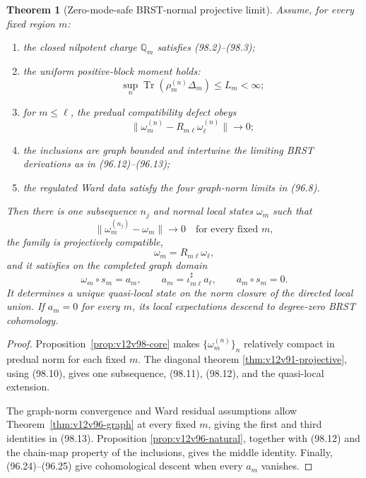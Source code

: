 \documentclass[11pt]{article}
\newtheorem{theorem}{Theorem}[section]
\theoremstyle{remark}
\begin{document}
\begin{theorem}[Zero-mode-safe BRST-normal projective limit]
\label{thm:v12v98-integrated}
Assume, for every fixed region \(m\):

\begin{enumerate}
\item the closed nilpotent charge \({\mathbb Q}_m\) satisfies
(98.2)--(98.3);
\item the uniform positive-block moment holds:
\[
 \sup_n\operatorname{Tr}(\rho_m^{(n)}\Delta_m)\leq L_m<\infty;
                                                                    \tag{98.9}
\]
\item for \(m\leq\ell\), the predual compatibility defect obeys
\[
 \|\omega_m^{(n)}
 -R_{m\ell}\omega_\ell^{(n)}\|\longrightarrow0;                 \tag{98.10}
\]
\item the inclusions are graph bounded and intertwine the limiting
BRST derivations as in (96.12)--(96.13);
\item the regulated Ward data satisfy the four graph-norm limits in
(96.8).
\end{enumerate}

Then there is one subsequence \(n_j\) and normal local states
\(\omega_m\) such that
\[
 \|\omega_m^{(n_j)}-\omega_m\|\longrightarrow0
 \quad\text{for every fixed }m,                                 \tag{98.11}
\]
the family is projectively compatible,
\[
 \omega_m=R_{m\ell}\omega_\ell,                                 \tag{98.12}
\]
and it satisfies on the completed graph domain
\[
 \omega_m\circ s_m=a_m,\qquad
 a_m=\iota_{m\ell}^{\sharp}a_\ell,\qquad
 a_m\circ s_m=0.                                                \tag{98.13}
\]
It determines a unique quasi-local state on the norm closure of the
directed local union.  If \(a_m=0\) for every \(m\), its local
expectations descend to degree-zero BRST cohomology.
\end{theorem}

\begin{proof}
Proposition~\ref{prop:v12v98-core} makes
\(\{\omega_m^{(n)}\}_n\) relatively compact in predual norm for each
fixed \(m\).  The diagonal theorem
\ref{thm:v12v91-projective}, using (98.10), gives one subsequence,
(98.11), (98.12), and the quasi-local extension.

The graph-norm convergence and Ward residual assumptions allow
Theorem~\ref{thm:v12v96-graph} at every fixed \(m\), giving the first
and third identities in (98.13).  Proposition
\ref{prop:v12v96-natural}, together with (98.12) and the chain-map
property of the inclusions, gives the middle identity.  Finally,
(96.24)--(96.25) give cohomological descent when every \(a_m\)
vanishes.
\end{proof}
\end{document}
